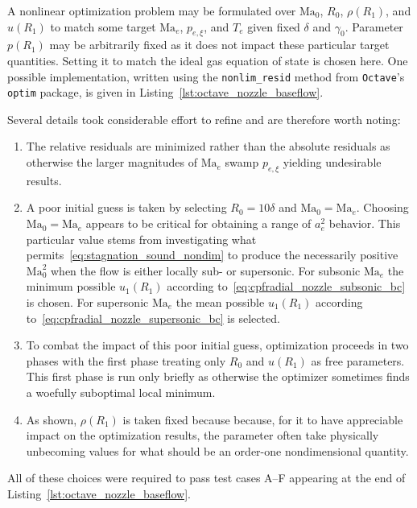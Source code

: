 \documentclass[letterpaper,11pt,nointlimits,reqno]{amsart}
\makeatletter
\newcommand{\Mach}[1][]{\mbox{Ma}_{#1}}
\newcommand\mynobreakpar{\par\nobreak\@afterheading}
\makeatother
\begin{document}
A nonlinear optimization problem may be formulated over $\Mach[0]$, $R_0$,
$\rho\!\left(R_1\right)$, and $u\!\left(R_1\right)$ to match some target
$\Mach[e]{}$, $p_{e,\xi}$, and $T_e$ given fixed $\delta$ and $\gamma_0$.
Parameter $p\!\left(R_1\right)$ may be arbitrarily fixed as it does not impact
these particular target quantities.  Setting it to match the ideal gas equation
of state is chosen here.  One possible implementation, written using the
\texttt{nonlim\_resid} method from \texttt{Octave}'s \texttt{optim} package, is
given in Listing~\ref{lst:octave_nozzle_baseflow}.

Several details took considerable effort to refine and are therefore worth
noting:\mynobreakpar
\begin{enumerate}
  \item The relative residuals are minimized rather than the absolute residuals
    as otherwise the larger magnitudes of $\Mach[e]{}$ swamp $p_{e,\xi}$
    yielding undesirable results.
  \item A poor initial guess is taken by selecting $R_0 = 10\delta$ and
    $\Mach[0]{}=\Mach[e]{}$.  Choosing $\Mach[0]{}=\Mach[e]{}$ appears to be
    critical for obtaining a range of $a_e^2$ behavior.  This particular value
    stems from investigating what permits~\eqref{eq:stagnation_sound_nondim} to
    produce the necessarily positive $\Mach[0]^2$ when the flow is either
    locally sub- or supersonic.  For subsonic $\Mach[e]{}$ the minimum possible
    $u_1\!\left(R_1\right)$ according
    to~\eqref{eq:cpfradial_nozzle_subsonic_bc} is chosen.  For supersonic
    $\Mach[e]{}$ the mean possible $u_1\!\left(R_1\right)$ according
    to~\eqref{eq:cpfradial_nozzle_supersonic_bc} is selected.
  \item To combat the impact of this poor initial guess, optimization proceeds
    in two phases with the first phase treating only $R_0$ and
    $u\!\left(R_1\right)$ as free parameters.  This first phase is run only
    briefly as otherwise the optimizer sometimes finds a woefully suboptimal
    local minimum.
  \item As shown, $\rho\!\left(R_1\right)$ is taken fixed because because, for
    it to have appreciable impact on the optimization results, the parameter
    often take physically unbecoming values for what should be an order-one
    nondimensional quantity.
\end{enumerate}
All of these choices were required to pass test cases A--F appearing at the end
of Listing~\ref{lst:octave_nozzle_baseflow}.
\end{document}
